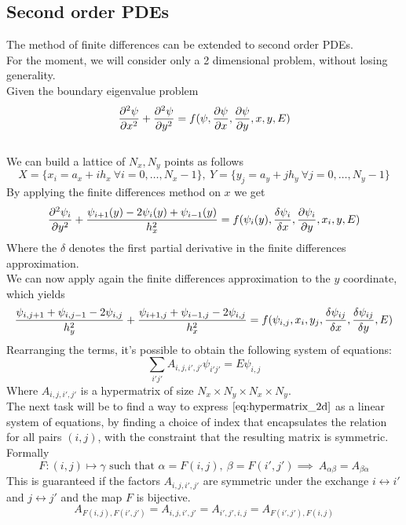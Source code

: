 \documentclass{article}
\begin{document}
\subsection{Second order PDEs}
The method of finite differences can be extended to second order PDEs.
\\For the moment, we will consider only a 2 dimensional problem, without losing generality.
\\Given the boundary eigenvalue problem
\begin{equation}
\pdv[2]{\psi}{x}+\pdv[2]{\psi}{y} = f(\psi, \pdv{\psi}{x}, \pdv{\psi}{y}, x, y, E)
\end{equation}
\\We can build a lattice of $N_x, N_y$ points as follows
\begin{equation}
    X = \{x_i = a_x + ih_x \ \forall i = 0, \ldots, N_x-1\}, \  Y = \{y_j = a_y + jh_y \ \forall j = 0, \ldots, N_y-1\}
\end{equation}
By applying the finite differences method on $x$ we get
\begin{equation}
    \pdv[2]{\psi_i}{y} + \frac{\psi_{i+1}(y) - 2\psi_i(y) + \psi_{i-1}(y)}{h_x^2} = f(\psi_i(y), \fdv{\psi_i}{x}, \pdv{\psi_i}{y}, x_i, y, E)
\end{equation}
Where the $\delta$ denotes the first partial derivative in the finite differences approximation.
\\We can now apply again the finite differences approximation to the $y$ coordinate, which yields
\begin{equation}
    \frac{\psi_{i, j+1}+\psi_{i, j-1}-2\psi_{i, j}}{h_y^2} + \frac{\psi_{i+1, j}+\psi_{i-1, j}-2\psi_{i,j}}{h_x^2} = f(\psi_{i, j}, x_i, y_j, \fdv{\psi_{ij}}{x}, \fdv{\psi_{ij}}{y}, E)\label{eq:finite_diff_2nd_pde}
\end{equation}
Rearranging the terms, it's possible to obtain the following system of equations:
\begin{equation}
    \sum_{i'j'}A_{i,j,i',j'}\psi_{i'j'} = E\psi_{i,j}\label{eq:hypermatrix_2d}
\end{equation}
Where $A_{i,j,i',j'}$ is a hypermatrix of size $N_x \times N_y \times N_x \times N_y$.
\\The next task will be to find a way to express $\ref{eq:hypermatrix_2d}$ as a linear system of equations, by finding a choice of index that encapsulates the relation for all pairs $(i, j)$, with the constraint that the resulting matrix is symmetric.
\\Formally
\begin{equation}
    F:(i,j)\mapsto \gamma \text{ such that }\alpha = F(i, j),\ \beta = F(i',j')\implies\ A_{\alpha\beta} = A_{\beta\alpha}
\end{equation}
This is guaranteed if the factors $A_{i,j,i',j'}$ are symmetric under the exchange  $i \leftrightarrow i'$ and $j \leftrightarrow j'$ and the map $F$ is bijective.
\begin{equation}
    A_{F(i,j),F(i',j')} = A_{i,j,i',j'} = A_{i', j', i, j} = A_{F(i',j'),F(i,j)}
\end{equation}
\end{document}
